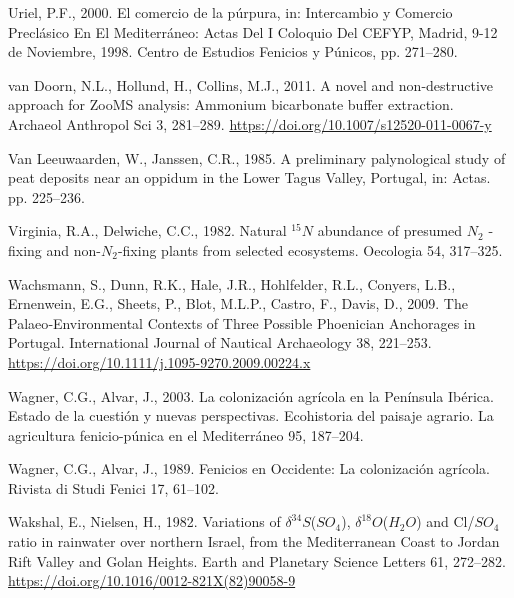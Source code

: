 \documentclass[preprint, 3p, authoryear]{elsarticle} %
\newlength{\cslhangindent}
\newlength{\cslentryspacingunit} %
\newenvironment{CSLReferences}[2] %
 {%
  \setlength{\parindent}{0pt}
  \ifodd #1
  \let\oldpar\par
  \def\par{\hangindent=\cslhangindent\oldpar}
  \fi
  \setlength{\parskip}{#2\cslentryspacingunit}
 }%
 {}
\begin{document}
\begin{CSLReferences}{1}{0}
\leavevmode{}%
Uriel, P.F., 2000. El comercio de la púrpura, in: Intercambio y Comercio Preclásico En El {Mediterráneo}: Actas Del {I} Coloquio Del {CEFYP}, {Madrid}, 9-12 de Noviembre, 1998. {Centro de Estudios Fenicios y Púnicos}, pp. 271--280.

\leavevmode{}%
van Doorn, N.L., Hollund, H., Collins, M.J., 2011. A novel and non-destructive approach for {ZooMS} analysis: Ammonium bicarbonate buffer extraction. Archaeol Anthropol Sci 3, 281--289. \url{https://doi.org/10.1007/s12520-011-0067-y}

\leavevmode{}%
Van Leeuwaarden, W., Janssen, C.R., 1985. A preliminary palynological study of peat deposits near an oppidum in the {Lower Tagus Valley}, {Portugal}, in: Actas. pp. 225--236.

\leavevmode{}%
Virginia, R.A., Delwiche, C.C., 1982. Natural \(^{15}N\) abundance of presumed \(N_{2}\) -fixing and non-\(N_{2}\)-fixing plants from selected ecosystems. Oecologia 54, 317--325.

\leavevmode{}%
Wachsmann, S., Dunn, R.K., Hale, J.R., Hohlfelder, R.L., Conyers, L.B., Ernenwein, E.G., Sheets, P., Blot, M.L.P., Castro, F., Davis, D., 2009. The {Palaeo}‐{Environmental Contexts} of {Three Possible Phoenician Anchorages} in {Portugal}. International Journal of Nautical Archaeology 38, 221--253. \url{https://doi.org/10.1111/j.1095-9270.2009.00224.x}

\leavevmode{}%
Wagner, C.G., Alvar, J., 2003. La colonización agrícola en la {Península Ibérica}. {Estado} de la cuestión y nuevas perspectivas. Ecohistoria del paisaje agrario. La agricultura fenicio-púnica en el Mediterráneo 95, 187--204.

\leavevmode{}%
Wagner, C.G., Alvar, J., 1989. Fenicios en {Occidente}: La colonización agrícola. Rivista di Studi Fenici 17, 61--102.

\leavevmode{}%
Wakshal, E., Nielsen, H., 1982. Variations of {\(\delta ^{34}S\)}({\(SO_{4}\)}), {\(\delta ^{18}O\)}({\(H_{2}O\)}) and {Cl}/{\(SO_{4}\)} ratio in rainwater over northern {Israel}, from the {Mediterranean Coast} to {Jordan Rift Valley} and {Golan Heights}. Earth and Planetary Science Letters 61, 272--282. \url{https://doi.org/10.1016/0012-821X(82)90058-9}


\end{CSLReferences}
\end{document}
